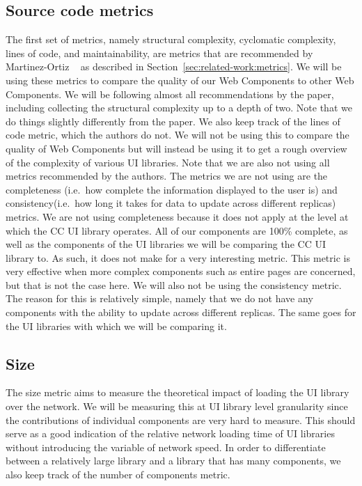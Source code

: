 \subsection{Source code metrics}
The first set of metrics, namely structural complexity, cyclomatic complexity, lines of code, and maintainability, are metrics that are recommended by Martinez-Ortiz \etal{}~\cite{martinez-ortiz2016quality} as described in Section~\ref{sec:related-work:metrics}. We will be using these metrics to compare the quality of our Web Components to other Web Components. We will be following almost all recommendations by the paper, including collecting the structural complexity up to a depth of two. Note that we do things slightly differently from the paper. We also keep track of the lines of code metric, which the authors do not. We will not be using this to compare the quality of Web Components but will instead be using it to get a rough overview of the complexity of various UI libraries. Note that we are also not using all metrics recommended by the authors. The metrics we are not using are the completeness (i.e.~how complete the information displayed to the user is) and consistency(i.e.~how long it takes for data to update across different replicas) metrics. We are not using completeness because it does not apply at the level at which the CC UI library operates. All of our components are 100\% complete, as well as the components of the UI libraries we will be comparing the CC UI library to. As such, it does not make for a very interesting metric. This metric is very effective when more complex components such as entire pages are concerned, but that is not the case here. We will also not be using the consistency metric. The reason for this is relatively simple, namely that we do not have any components with the ability to update across different replicas. The same goes for the UI libraries with which we will be comparing it.

\subsection{Size}
The size metric aims to measure the theoretical impact of loading the UI library over the network. We will be measuring this at UI library level granularity since the contributions of individual components are very hard to measure. This should serve as a good indication of the relative network loading time of UI libraries without introducing the variable of network speed. In order to differentiate between a relatively large library and a library that has many components, we also keep track of the number of components metric.

